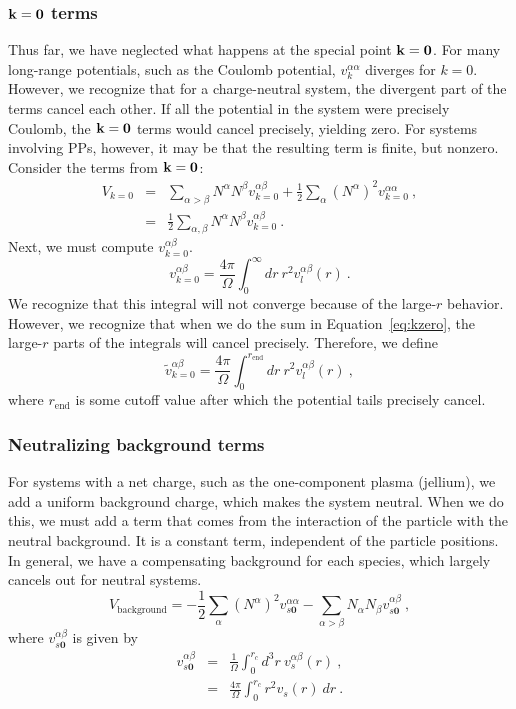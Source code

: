 \subsubsection{$\mathbf{k}=\mathbf{0}$ terms}
Thus far, we have neglected what happens at the special point $\mathbf{k} =
\mathbf{0}$.  For many long-range potentials, such as the Coulomb
potential, $v_k^{\alpha \alpha}$ diverges for $k=0$.  However, we
recognize that for a charge-neutral system, the divergent part of the
terms cancel each other.  If all the potential in the system were
precisely Coulomb, the $\mathbf{k}=\mathbf{0}$ terms would cancel precisely,
yielding zero.  For systems involving PPs, however, it
may be that the resulting term is finite, but nonzero.  Consider
the terms from $\mathbf{k}=\mathbf{0}$:
\begin{eqnarray}
V_{k=0} & = & \sum_{\alpha>\beta} N^\alpha N^\beta v^{\alpha \beta}_{k=0}
+ \frac{1}{2} \sum_\alpha \left(N^{\alpha}\right)^2 v^{\alpha\alpha}_{k=0}\:, \\
& = & \frac{1}{2} \sum_{\alpha,\beta} N^\alpha N^\beta v^{\alpha
  \beta}_{k=0}\:.
\label{eq:kzero}
\end{eqnarray}
Next, we must compute $v^{\alpha \beta}_{k=0}$.  
\begin{equation}
v^{\alpha \beta}_{k=0} = \frac{4 \pi}{\Omega} \int_0^\infty dr\ r^2
v_l^{\alpha \beta}(r)\:.
\end{equation}
We recognize that this integral will not converge because of the
large-$r$ behavior.  However, we recognize that when we do the sum in
Equation~\ref{eq:kzero}, the large-$r$ parts of the integrals will cancel
precisely.  Therefore, we define
\begin{equation}
\tilde{v}^{\alpha \beta}_{k=0} = \frac{4 \pi}{\Omega} 
\int_0^{r_\text{end}} dr\ r^2 v_l^{\alpha \beta}(r)\:,
\end{equation}
where $r_{\text{end}}$ is some cutoff value after which the potential
tails precisely cancel.
\subsubsection{Neutralizing background terms}
For systems with a net charge, such as the one-component plasma
(jellium), we add a uniform background charge, which makes the system
neutral.  When we do this, we must add a term that comes from the
interaction of the particle with the neutral background.  It is a
constant term, independent of the particle positions.  In general, we
have a compensating background for each species, which largely cancels
out for neutral systems.
\begin{equation}
V_\text{background} = -\frac{1}{2} \sum_\alpha \left(N^\alpha\right)^2 
v^{\alpha \alpha}_{s\mathbf{0}}
-\sum_{\alpha > \beta} N_\alpha N_\beta
v^{\alpha\beta}_{s\mathbf{0}}\:,
\end{equation}
where $v^{\alpha \beta}_{s\mathbf{0}}$ is given by
\begin{eqnarray}
v^{\alpha \beta}_{s\mathbf{0}} & = & \frac{1}{\Omega} \int_0^{r_c} d^3 r\ 
v^{\alpha \beta}_s(r)\:, \\
& = & \frac{4 \pi}{\Omega} \int_0^{r_c} r^2 v_s(r) \ dr \nonumber\:.
\end{eqnarray}


